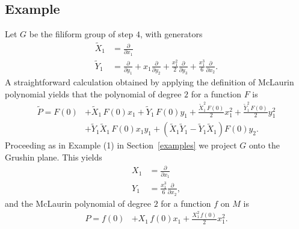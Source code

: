 \documentclass[12pt]{amsart}
\begin{document}
\subsection{Example}
 Let $G$ be the filiform group of step $4$, with generators 
  \begin{align*}
\tilde X_1 &= \frac{\partial}{\partial x_1}\\
\tilde Y_1 &=  \frac{\partial}{\partial y_1} + x_1  \frac{\partial}{\partial y_2}+ \frac{x_1^2}{2} \frac{\partial}{\partial y_{3}}+ \frac{x_1^3}{6}\frac{\partial}{\partial x_{2}}.
\end{align*}
A straightforward calculation obtained by applying the definition of McLaurin polynomial yields that the polynomial of degree $2$ for a function $F$ is 
 \begin{align*}
     \tilde P = F(0)&+\tilde X_1\,F(0) x_1 + \tilde Y_1\, F(0)y_1 +\frac{\tilde X_1^2\,F(0)}{2}x_1^2 +\frac{\tilde Y_1^2\,F(0)}{2}y_1^2\\
 &+ {\tilde Y_1 \tilde X_1\,F(0)}x_1 y_1 +(\tilde X_1\tilde Y_1-\tilde Y_1 \tilde X_1)F(0)y_2.
  \end{align*}
Proceeding as in Example (1) in Section~\ref{examples} we project $G$ onto the Grushin plane. This yields
  \begin{align*}
 X_1 &= \frac{\partial}{\partial x_1}\\
 Y_1 &=   \frac{x_1^3}{6}\frac{\partial}{\partial x_{2}},
\end{align*}
and the McLaurin polynomial of degree $2$ for a function $f$ on $M$ is 
 \begin{align*}
      P = f(0)&+ X_1\,f(0) x_1  +\frac{ X_1^2\,f(0)}{2}x_1^2.
  \end{align*}
\end{document}
